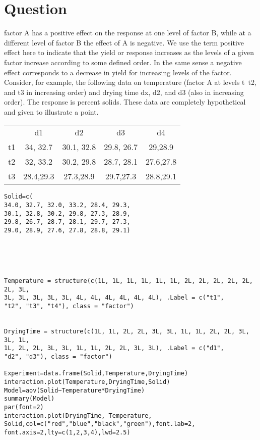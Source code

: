 \documentclass[a4paper,12pt]{article}
\begin{document}
\section{Question }

factor A has a positive effect on the
response at one level of factor B, while at a different level of factor B the effect of
A is negative. We use the term positive effect here to indicate that the yield or
response increases as the levels of a given factor increase according to some defined
order. In the same sense a negative effect corresponds to a decrease in yield for
increasing levels of the factor.
Consider, for example, the following data on temperature (factor A at levels t\,
t2, and t3 in increasing order) and drying time dx, d2, and d3 (also in increasing
order). The response is percent solids. These data are completely hypothetical
and given to illustrate a point.

\begin{tabular}{|c|c|c|c|c|}
\hline

& d1 &	d2	&	d3	& d4	 \\
t1 & 34, 32.7 &	30.1, 32.8	&	29.8, 26.7	&	29,28.9	 \\
t2 & 32, 33.2 &	30.2, 29.8	&	28.7, 28.1	&	27.6,27.8	\\
t3 & 28.4,29.3	&	27.3,28.9	&	29.7,27.3	&	28.8,29.1	\\

\hline 
\end{tabular} 


\begin{verbatim}
Solid=c(
34.0, 32.7, 32.0, 33.2, 28.4, 29.3, 
30.1, 32.8, 30.2, 29.8, 27.3, 28.9, 
29.8, 26.7, 28.7, 28.1, 29.7, 27.3, 
29.0, 28.9, 27.6, 27.8, 28.8, 29.1)





Temperature = structure(c(1L, 1L, 1L, 1L, 1L, 1L, 2L, 2L, 2L, 2L, 2L, 2L, 3L, 
3L, 3L, 3L, 3L, 3L, 4L, 4L, 4L, 4L, 4L, 4L), .Label = c("t1", 
"t2", "t3", "t4"), class = "factor")


DryingTime = structure(c(1L, 1L, 2L, 2L, 3L, 3L, 1L, 1L, 2L, 2L, 3L, 3L, 1L, 
1L, 2L, 2L, 3L, 3L, 1L, 1L, 2L, 2L, 3L, 3L), .Label = c("d1", 
"d2", "d3"), class = "factor")

Experiment=data.frame(Solid,Temperature,DryingTime)
interaction.plot(Temperature,DryingTime,Solid)
Model=aov(Solid~Temperature*DryingTime)
summary(Model)
par(font=2)
interaction.plot(DryingTime, Temperature, Solid,col=c("red","blue","black","green"),font.lab=2,
font.axis=2,lty=c(1,2,3,4),lwd=2.5)
\end{verbatim}
\end{document}
